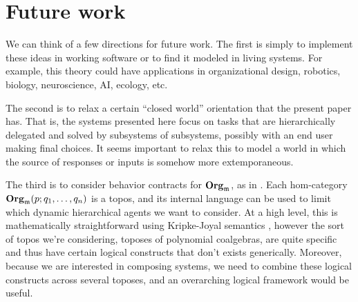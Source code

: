 \documentclass[11pt, one side, article]{memoir}
\begin{document}







\chapter{Future work}

We can think of a few directions for future work. The first is simply to implement these ideas in working software or to find it modeled in living systems. For example, this theory could have applications in organizational design, robotics, biology, neuroscience, AI, ecology, etc. 

The second is to relax a certain ``closed world'' orientation that the present paper has. That is, the systems presented here focus on tasks that are hierarchically delegated and solved by subsystems of subsystems, possibly with an end user making final choices. It seems important to relax this to model a world in which the source of responses or inputs is somehow more extemporaneous.

The third is to consider behavior contracts for $\mathbf{Org}_{\mathfrak{m}}$, as in \cite{schultz2016dynamical,spivak2021learnersv1}. Each hom-category $\mathbf{Org}_{\mathfrak{m}}(p;q_1,\ldots,q_n)$ is a topos, and its internal language can be used to limit which dynamic hierarchical agents we want to consider. At a high level, this is mathematically straightforward using Kripke-Joyal semantics \cite[Chapter VI]{macLane1992sheaves}, however the sort of topos we're considering, toposes of polynomial coalgebras, are quite specific and thus have certain logical constructs that don't exists generically. Moreover, because we are interested in composing systems, we need to combine these logical constructs across several toposes, and an overarching logical framework would be useful.

\printbibliography
\end{document}
